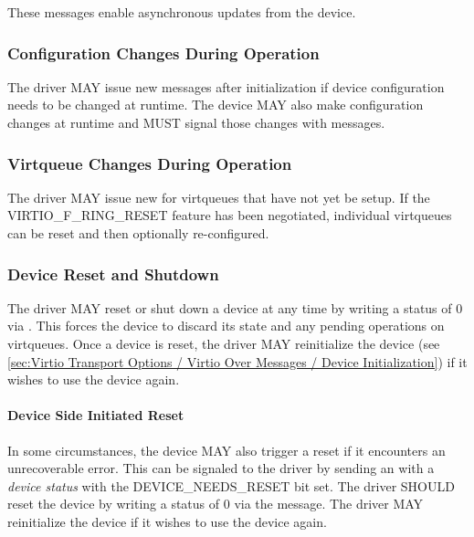 These messages enable asynchronous updates from the device.

\subsubsection{Configuration Changes During Operation}
\label{sec:Virtio Transport Options / Virtio Over Messages / Device Operation / ConfigUpdates}

The driver MAY issue new 
messages after initialization if device configuration needs to be
changed at runtime. The device MAY also make configuration changes at
runtime and MUST signal those changes with 
messages.

\subsubsection{Virtqueue Changes During Operation}
\label{sec:Virtio Transport Options / Virtio Over Messages / Device Operation / VQueueUpdates}

The driver MAY issue new  for virtqueues that have not
yet be setup.  If the VIRTIO_F_RING_RESET feature has been negotiated,
individual virtqueues can be reset and then optionally re-configured.

\subsubsection{Device Reset and Shutdown}
\label{sec:Virtio Transport Options / Virtio Over Messages / Device Operation / Reset}

The driver MAY reset or shut down a device at any time by writing a status
of 0 via . This forces the device to discard its state
and any pending operations on virtqueues. Once a device is reset, the driver
MAY reinitialize the device (see
\ref{sec:Virtio Transport Options / Virtio Over Messages / Device Initialization})
if it wishes to use the device again.

\paragraph{Device Side Initiated Reset}
In some circumstances, the device MAY also trigger a reset if it
encounters an unrecoverable error. This can be signaled to the driver by sending
an  with a \emph{device status} with the DEVICE_NEEDS_RESET
bit set.  The driver SHOULD reset the device by writing a status of 0
via the  message. The driver MAY reinitialize
the device if it wishes to use the device again.

